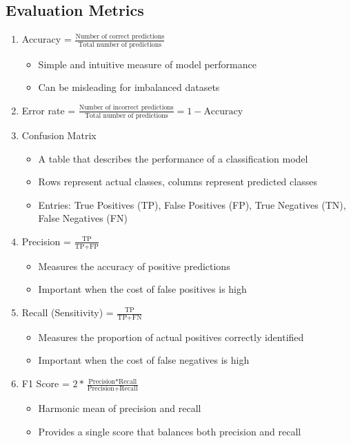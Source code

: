 \documentclass{article}
\begin{document}
\subsection{Evaluation Metrics}
\begin{enumerate}
    \item Accuracy = $\frac{\text{Number of correct predictions}}{\text{Total number of predictions}}$
    \begin{itemize}
        \item Simple and intuitive measure of model performance
        \item Can be misleading for imbalanced datasets
    \end{itemize}
    
    \item Error rate = $\frac{\text{Number of incorrect predictions}}{\text{Total number of predictions}} = 1 - \text{Accuracy}$
    
    \item Confusion Matrix
    \begin{itemize}
        \item A table that describes the performance of a classification model
        \item Rows represent actual classes, columns represent predicted classes
        \item Entries: True Positives (TP), False Positives (FP), True Negatives (TN), False Negatives (FN)
    \end{itemize}
    
    \item Precision = $\frac{\text{TP}}{\text{TP} + \text{FP}}$
    \begin{itemize}
        \item Measures the accuracy of positive predictions
        \item Important when the cost of false positives is high
    \end{itemize}
    
    \item Recall (Sensitivity) = $\frac{\text{TP}}{\text{TP} + \text{FN}}$
    \begin{itemize}
        \item Measures the proportion of actual positives correctly identified
        \item Important when the cost of false negatives is high
    \end{itemize}
    
    \item F1 Score = $2 * \frac{\text{Precision} * \text{Recall}}{\text{Precision} + \text{Recall}}$
    \begin{itemize}
        \item Harmonic mean of precision and recall
        \item Provides a single score that balances both precision and recall
    \end{itemize}
    

\end{enumerate}
\end{document}
